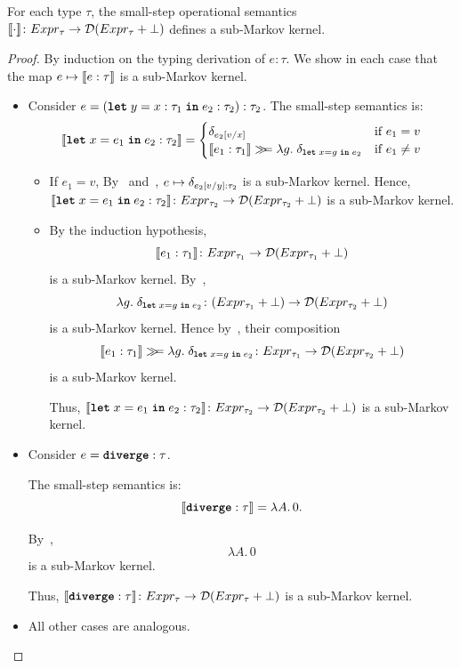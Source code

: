 \begin{lemma}\label{lem:small-step-kernel}
    For each type $\tau$, the small-step operational semantics $\llbracket \cdot \rrbracket \colon Expr_{\tau} \to \mathcal{D}(Expr_{\tau} + \bot)$ defines a sub-Markov kernel.
\end{lemma}
\begin{proof}
    By induction on the typing derivation of $e : \tau$. We show in each case that the map $e \mapsto \llbracket e : \tau \rrbracket$ is a sub-Markov kernel.

	\begin{itemize}
		\item Consider $e = (\textnormal{\ttfamily\bfseries let}\; y = x : \tau_1 \; \textnormal{\ttfamily\bfseries in}\; e_2 : \tau_2) : \tau_2$. The small-step semantics is:
		\[
			\llbracket \textnormal{\ttfamily\bfseries let} \; x = e_1 \; \textnormal{\ttfamily\bfseries in} \; e_2 : \tau_2 \rrbracket =
			\begin{cases}
				\delta_{e_2[v/x]} & \text{if } e_1 = v \\
				\llbracket e_1 : \tau_1 \rrbracket \gg\!\!= \lambda g.\; \delta_{\textnormal{\ttfamily\bfseries let} \; x = g \; \textnormal{\ttfamily\bfseries in} \; e_2} & \text{if } e_1 \neq v
			\end{cases}
		\]
		\begin{itemize}
			\item If $e_1 = v$, By~ and~, $e \mapsto \delta_{e_2[v/y] : \tau_2}$ is a sub-Markov kernel. Hence, $\llbracket \textnormal{\ttfamily\bfseries let} \; x = e_1 \; \textnormal{\ttfamily\bfseries in} \; e_2 : \tau_2 \rrbracket \colon Expr_{\tau_2} \to \mathcal{D}(Expr_{\tau_2} + \bot)$ is a sub-Markov kernel.
			
			\item By the induction hypothesis, 
			\[
				\llbracket e_1 : \tau_1 \rrbracket \colon Expr_{\tau_1} \to \mathcal{D}(Expr_{\tau_1} + \bot)
			\]
			is a sub-Markov kernel. By~,
			\[
				\lambda g.\; \delta_{\textnormal{\ttfamily\bfseries let} \; x = g \; \textnormal{\ttfamily\bfseries in} \; e_2} \colon 
				(Expr_{\tau_1} + \bot) \to \mathcal{D}(Expr_{\tau_2} + \bot)
			\]
			is a sub-Markov kernel. Hence by~, their composition
			\[
				\llbracket e_1 : \tau_1 \rrbracket \gg\!\!= \lambda g.\; \delta_{\textnormal{\ttfamily\bfseries let} \; x = g \; \textnormal{\ttfamily\bfseries in} \; e_2}
				\colon Expr_{\tau_1} \to \mathcal{D}(Expr_{\tau_2} + \bot)
			\]
			is a sub-Markov kernel.
			
			Thus, $\llbracket \textnormal{\ttfamily\bfseries let} \; x = e_1 \; \textnormal{\ttfamily\bfseries in} \; e_2 : \tau_2 \rrbracket \colon Expr_{\tau_2} \to \mathcal{D}(Expr_{\tau_2} + \bot)$ is a sub-Markov kernel.
		\end{itemize}

		\item Consider $e = \textnormal{\ttfamily\bfseries diverge} : \tau$.
		
		The small-step semantics is:
		\[
			\llbracket \textnormal{\ttfamily\bfseries diverge} : \tau \rrbracket = \lambda A.\, 0.
		\]

		By~,
		\[
			\lambda A.\, 0
		\]
		is a sub-Markov kernel.

		Thus, $\llbracket \textnormal{\ttfamily\bfseries diverge} : \tau \rrbracket \colon Expr_{\tau} \to \mathcal{D}(Expr_{\tau} + \bot)$ is a sub-Markov kernel.
		
		\item All other cases are analogous.
	\end{itemize}
\end{proof}






